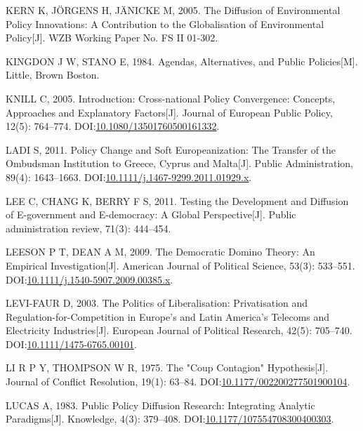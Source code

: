 \documentclass[
  12pt,
]{ctexart}
\newlength{\cslhangindent}
\newlength{\cslentryspacingunit} %
\newenvironment{CSLReferences}[2] %
 {%
  \setlength{\parindent}{0pt}
  \ifodd #1
  \let\oldpar\par
  \def\par{\hangindent=\cslhangindent\oldpar}
  \fi
  \setlength{\parskip}{#2\cslentryspacingunit}
 }%
 {}
\begin{document}
\begin{CSLReferences}{1}{0}
\leavevmode{}%
KERN K, JÖRGENS H, JÄNICKE M, 2005. The Diffusion of Environmental Policy Innovations: A Contribution to the Globalisation of Environmental Policy{[}J{]}. {WZB Working Paper No. FS II 01-302}.

\leavevmode{}%
KINGDON J W, STANO E, 1984. Agendas, Alternatives, and Public Policies{[}M{]}. {Little, Brown Boston}.

\leavevmode{}%
KNILL C, 2005. Introduction: {Cross-national} Policy Convergence: Concepts, Approaches and Explanatory Factors{[}J{]}. Journal of European Public Policy, 12(5): 764--774. DOI:\href{https://doi.org/10.1080/13501760500161332}{10.1080/13501760500161332}.

\leavevmode{}%
LADI S, 2011. Policy {Change} and {Soft Europeanization}: {The Transfer} of the {Ombudsman Institution} to {Greece}, {Cyprus} and {Malta}{[}J{]}. Public Administration, 89(4): 1643--1663. DOI:\href{https://doi.org/10.1111/j.1467-9299.2011.01929.x}{10.1111/j.1467-9299.2011.01929.x}.

\leavevmode{}%
LEE C, CHANG K, BERRY F S, 2011. Testing the Development and Diffusion of E-government and E-democracy: {A} Global Perspective{[}J{]}. Public administration review, 71(3): 444--454.

\leavevmode{}%
LEESON P T, DEAN A M, 2009. The {Democratic Domino Theory}: {An Empirical Investigation}{[}J{]}. American Journal of Political Science, 53(3): 533--551. DOI:\href{https://doi.org/10.1111/j.1540-5907.2009.00385.x}{10.1111/j.1540-5907.2009.00385.x}.

\leavevmode{}%
LEVI-FAUR D, 2003. The Politics of Liberalisation: {Privatisation} and Regulation-for-Competition in {Europe}'s and {Latin America}'s Telecoms and Electricity Industries{[}J{]}. European Journal of Political Research, 42(5): 705--740. DOI:\href{https://doi.org/10.1111/1475-6765.00101}{10.1111/1475-6765.00101}.

\leavevmode{}%
LI R P Y, THOMPSON W R, 1975. The "{Coup Contagion}" {Hypothesis}{[}J{]}. Journal of Conflict Resolution, 19(1): 63--84. DOI:\href{https://doi.org/10.1177/002200277501900104}{10.1177/002200277501900104}.

\leavevmode{}%
LUCAS A, 1983. Public {Policy Diffusion Research}: {Integrating Analytic Paradigms}{[}J{]}. Knowledge, 4(3): 379--408. DOI:\href{https://doi.org/10.1177/107554708300400303}{10.1177/107554708300400303}.


\end{CSLReferences}
\end{document}
